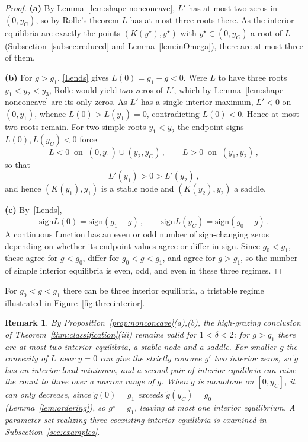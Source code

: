 \documentclass[reqno,11pt]{amsart}
\newtheorem{rem}[thm]{Remark}
\numberwithin{equation}{section}
\newcommand{\sign}{\mathrm{sign}}
\begin{document}
\begin{proof}
{\bf (a)} By Lemma~\ref{lem:shape-nonconcave}, $L'$ has at most two zeros in $(0,y_C)$, so by Rolle's theorem $L$ has at most three roots there. As the interior equilibria are exactly the points $(K(y^\star),y^\star)$ with $y^\star\in(0,y_C)$ a root of $L$ (Subsection~\ref{subsec:reduced} and Lemma~\ref{lem:inOmega}), there are at most three of them.

{\bf (b)} For $g>g_1$, \eqref{Lends} gives $L(0)=g_1-g<0$. Were $L$ to have three roots $y_1<y_2<y_3$, Rolle would yield two zeros of $L'$, which by Lemma~\ref{lem:shape-nonconcave} are its only zeros. As $L'$ has a single interior maximum, $L'<0$ on $(0,y_1)$, whence $L(0)>L(y_1)=0$, contradicting $L(0)<0$. Hence at most two roots remain. For two simple roots $y_1<y_2$ the endpoint signs $L(0),L(y_C)<0$ force
\[
L<0 \ \text{ on }\ (0,y_1)\cup(y_2,y_C)\,,\qquad L>0 \ \text{ on }\ (y_1,y_2)\,,
\]
so that
\[
L'(y_1)>0>L'(y_2)\,,
\]
and hence $(K(y_1),y_1)$ is a stable node and $(K(y_2),y_2)$ a saddle.

{\bf (c)} By~\eqref{Lends},
\[
\sign L(0)=\sign(g_1-g)\,,\qquad \sign L(y_C)=\sign(g_0-g)\,.
\]
A continuous function has an even or odd number of sign-changing zeros depending on whether its endpoint values agree or differ in sign. Since $g_0<g_1$, these agree for $g<g_0$, differ for $g_0<g<g_1$, and agree for $g>g_1$, so the number of simple interior equilibria is even, odd, and even in these three regimes.
\end{proof}

For $g_0<g<g_1$ there can be three interior equilibria, a tristable regime illustrated in Figure~\ref{fig:threeinterior}.

\begin{rem}\label{rem:nonconcave}
By Proposition~\ref{prop:nonconcave}(a),(b), the high-grazing conclusion of Theorem~\ref{thm:classification}(iii) remains valid for $1<\delta<2$: for $g>g_1$ there are at most two interior equilibria, a stable node and a saddle. For smaller $g$ the convexity of $L$ near $y=0$ can give the strictly concave $\tilde g'$ two interior zeros, so $\tilde g$ has an interior local minimum, and a second pair of interior equilibria can raise the count to three over a narrow range of $g$.
When $\tilde g$ is monotone on $[0,y_C]$, it can only decrease, since $\tilde g(0)=g_1$ exceeds $\tilde g(y_C)=g_0$ (Lemma~\ref{lem:ordering}), so $g^\star=g_1$, leaving at most one interior equilibrium. A parameter set realizing three coexisting interior equilibria is examined in Subsection~\ref{sec:examples}.
\end{rem}
\end{document}
